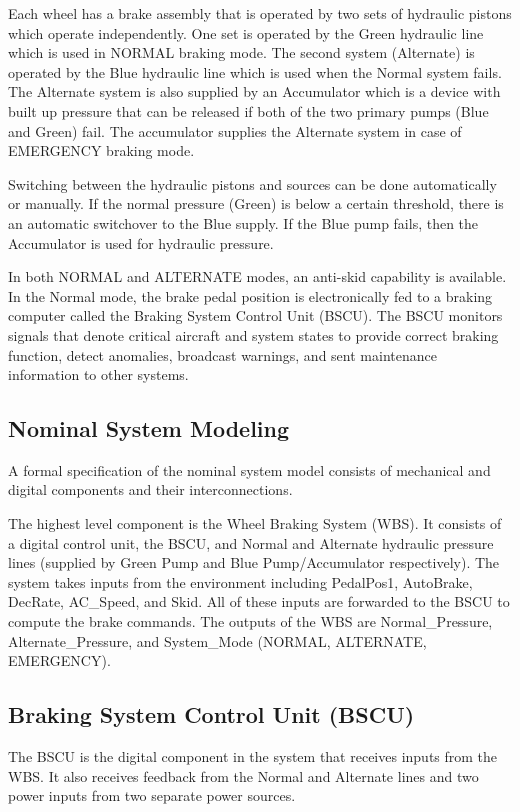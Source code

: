 Each wheel has a brake assembly that is operated by two sets of hydraulic pistons which operate independently. One set is operated by the Green hydraulic line which is used in NORMAL braking mode. The second system (Alternate) is operated by the Blue hydraulic line which is used when the Normal system fails. The Alternate system is also supplied by an Accumulator which is a device with built up pressure that can be released if both of the two primary pumps (Blue and Green) fail. The accumulator supplies the Alternate system in case of EMERGENCY braking mode. 

Switching between the hydraulic pistons and sources can be done automatically or manually. If the normal pressure (Green) is below a certain threshold, there is an automatic switchover to the Blue supply. If the Blue pump fails, then the Accumulator is used for hydraulic pressure. 

In both NORMAL and ALTERNATE modes, an anti-skid capability is available. In the Normal mode, the brake pedal position is electronically fed to a braking computer called the Braking System Control Unit (BSCU). The BSCU monitors signals that denote critical aircraft and system states to provide correct braking function, detect anomalies, broadcast warnings, and sent maintenance information to other systems. 

\subsection{Nominal System Modeling}
A formal specification of the nominal system model consists of mechanical and digital components and their interconnections. 

The highest level component is the Wheel Braking System (WBS). It consists of a digital control unit, the BSCU, and Normal and Alternate hydraulic pressure lines (supplied by Green Pump and Blue Pump/Accumulator respectively). The system takes inputs from the environment including PedalPos1, AutoBrake, DecRate, AC_Speed, and Skid. All of these inputs are forwarded to the BSCU to compute the brake commands. The outputs of the WBS are Normal_Pressure, Alternate_Pressure, and System_Mode (NORMAL, ALTERNATE, EMERGENCY).

\subsection{Braking System Control Unit (BSCU)}
The BSCU is the digital component in the system that receives inputs from the WBS. It also receives feedback from the Normal and Alternate lines and two power inputs from two separate power sources. 





